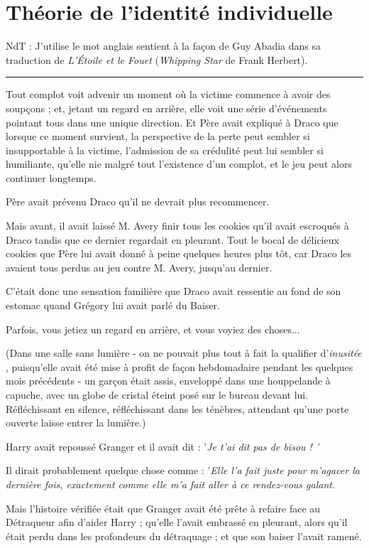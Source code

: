 
\chapter{Théorie de l'identité individuelle}

NdT : J'utilise le mot anglais sentient à la façon de Guy Abadia dans sa traduction de \emph{L'Étoile et le Fouet}  (\emph{Whipping Star}  de Frank Herbert).
\par\noindent\rule{\textwidth}{0.4pt}
Tout complot voit advenir un moment où la victime commence à avoir des soupçons ; et, jetant un regard en arrière, elle voit une série d'événements pointant tous dans une unique direction. Et Père avait expliqué à Draco que lorsque ce moment survient, la perspective de la perte peut sembler si insupportable à la victime, l'admission de sa crédulité peut lui sembler si humiliante, qu'elle nie malgré tout l'existence d'un complot, et le jeu peut alors continuer longtemps.

Père avait prévenu Draco qu'il ne devrait plus recommencer.

Mais avant, il avait laissé M. Avery finir tous les cookies qu'il avait escroqués à Draco tandis que ce dernier regardait en pleurant. Tout le bocal de délicieux cookies que Père lui avait donné à peine quelques heures plus tôt, car Draco les avaient tous perdus au jeu contre M. Avery, jusqu'au dernier.

C'était donc une sensation familière que Draco avait ressentie au fond de son estomac quand Grégory lui avait parlé du Baiser.

Parfois, vous jetiez un regard en arrière, et vous voyiez des choses...

(Dans une salle sans lumière - on ne pouvait plus tout à fait la qualifier d'\emph{inusitée} , puisqu'elle avait été mise à profit de façon hebdomadaire pendant les quelques mois précédents - un garçon était assis, enveloppé dans une houppelande à capuche, avec un globe de cristal éteint posé sur le bureau devant lui. Réfléchissant en silence, réfléchissant dans les ténèbres, attendant qu'une porte ouverte laisse entrer la lumière.)

Harry avait repoussé Granger et il avait dit : '\emph{Je t'ai dit pas de bisou ! '} 

Il dirait probablement quelque chose comme : '\emph{Elle l'a fait juste pour m'agacer la dernière fois, exactement comme elle m'a fait aller à ce rendez-vous galant.} 

Mais l'histoire vérifiée était que Granger avait été prête à refaire face au Détraqueur afin d'aider Harry ; qu'elle l'avait embrassé en pleurant, alors qu'il était perdu dans les profondeurs du détraquage ; et que son baiser l'avait ramené.

